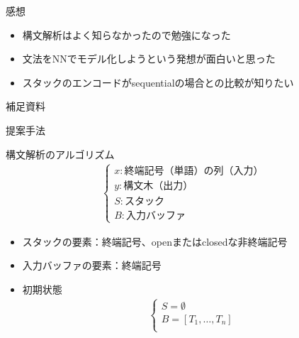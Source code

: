 \documentclass[aspectratio=43,unicode,10pt]{beamer}
\newcommand{\term}{終端記号}
\newcommand{\nt}{非終端記号}
\begin{document}
\begin{frame}{感想}
  \begin{itemize}
    \item 構文解析はよく知らなかったので勉強になった
    \item 文法をNNでモデル化しようという発想が面白いと思った
    \item スタックのエンコードがsequentialの場合との比較が知りたい
  \end{itemize}
\end{frame}

\begin{frame}
  \centering \large 補足資料
\end{frame}

\begin{frame}{提案手法}
  \begin{block}{構文解析のアルゴリズム}
    \begin{gather*}
      \begin{cases}
        x: \text{\term （単語）の列（入力）} \\
        y: \text{構文木（出力）} \\
        S: \text{スタック} \\
        B: \text{入力バッファ}
      \end{cases}
    \end{gather*}
    \begin{itemize}
      \item スタックの要素：\term、openまたはclosedな\nt
      \item 入力バッファの要素：\term
      \item 初期状態
        \begin{gather*}
          \begin{cases}
            S = \emptyset \\
            B = [T_1, \ldots, T_n] \\
          \end{cases}
        \end{gather*}
    \end{itemize}
  \end{block}
\end{frame}
\end{document}
